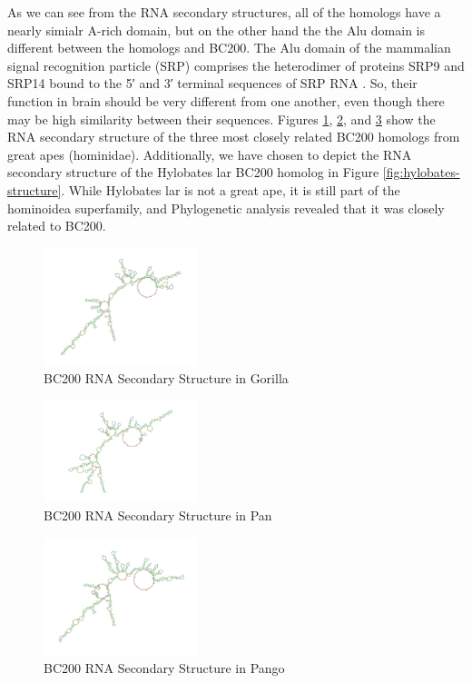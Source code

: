 \documentclass[conference]{IEEEtran}
\begin{document}
As we can see from the RNA secondary structures, all of the homologs have a nearly simialr A-rich domain, but on the other hand the the Alu domain is different between the homologs and BC200. 
The Alu domain of the mammalian signal recognition particle (SRP) comprises the heterodimer of proteins SRP9 and SRP14 bound to the 5′ and 3′ terminal sequences of SRP RNA \cite{weichenrieder2000structure}. 
So, their function in brain should be very different from one another, even though there may be high similarity between their sequences. 
Figures \ref{fig:gorilla-structure}, \ref{fig:pan-structure}, and \ref{fig:pango-structure} show the RNA secondary structure of the three most closely related BC200 homologs from great apes (hominidae). 
Additionally, we have chosen to depict the RNA secondary structure of the Hylobates lar BC200 homolog in Figure \ref{fig:hylobates-structure}. 
While Hylobates lar is not a great ape, it is still part of the hominoidea superfamily, and Phylogenetic analysis revealed that it was closely related to BC200.

\begin{figure}[h]
  \centering
  \includegraphics[width=0.4\textwidth]{figs/rnagorilla.png}
  \caption{BC200 RNA Secondary Structure in Gorilla}
  \label{fig:gorilla-structure}
\end{figure}

\begin{figure}[h]
  \centering
  \includegraphics[width=0.4\textwidth]{figs/rnapan.png}
  \caption{BC200 RNA Secondary Structure in Pan}
  \label{fig:pan-structure}
\end{figure}

\begin{figure}[h]
  \centering
  \includegraphics[width=0.4\textwidth]{figs/rnapango.png}
  \caption{BC200 RNA Secondary Structure in Pango}
  \label{fig:pango-structure}
\end{figure}
\end{document}

